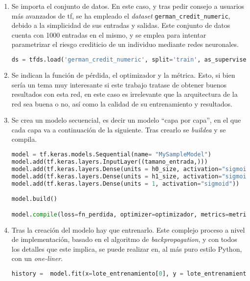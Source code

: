 \begin{enumerate}
    \item Se importa el conjunto de datos. En este caso, y tras pedir consejo a usuarios más avanzados de \acrshort{tf}, se ha empleado el \textit{dataset} \texttt{german\_credit\_numeric}, debido a la simplicidad de sus entradas y salidas. Este conjunto de datos cuenta con 1000 entradas en el mismo, y se emplea para intentar parametrizar el riesgo crediticio de un individuo mediante redes neuronales.\medskip
\begin{lstlisting}[language=Python]
ds = tfds.load('german_credit_numeric', split='train', as_supervised=True)
\end{lstlisting}

    \item Se indican la función de pérdida, el optimizador y la métrica. Esto, si bien sería un tema muy interesante si este trabajo tratase de obtener buenos resultados con esta red, en este caso es irrelevante que la arquitectura de la red sea buena o no, así como la calidad de su entrenamiento y resultados.

    \item Se crea un modelo secuencial, es decir un modelo ``capa por capa'', en el que cada capa va a continuación de la siguiente. Tras crearlo se \textit{buildea} y se compila.\medskip
\begin{lstlisting}[language=Python]
model = tf.keras.models.Sequential(name= "MySampleModel")
model.add(tf.keras.layers.InputLayer((tamano_entrada,)))
model.add(tf.keras.layers.Dense(units = h0_size, activation="sigmoid"))
model.add(tf.keras.layers.Dense(units = h1_size, activation="sigmoid"))
model.add(tf.keras.layers.Dense(units = 1, activation="sigmoid"))

model.build()

model.compile(loss=fn_perdida, optimizer=optimizador, metrics=metrica)
\end{lstlisting}

    \item Tras la creación del modelo hay que entrenarlo. Este complejo proceso a nivel de implementación, basado en el algoritmo de \textit{backpropagation}, y con todos los detalles que este implica, se puede realizar en, al más puro estilo Python, con un \textit{one-liner}.\medskip
\begin{lstlisting}[language=Python]
history =  model.fit(x=lote_entrenamiento[0], y = lote_entrenamiento[1], batch_size = 20, epochs=num_epochs)
\end{lstlisting}
\end{enumerate}

